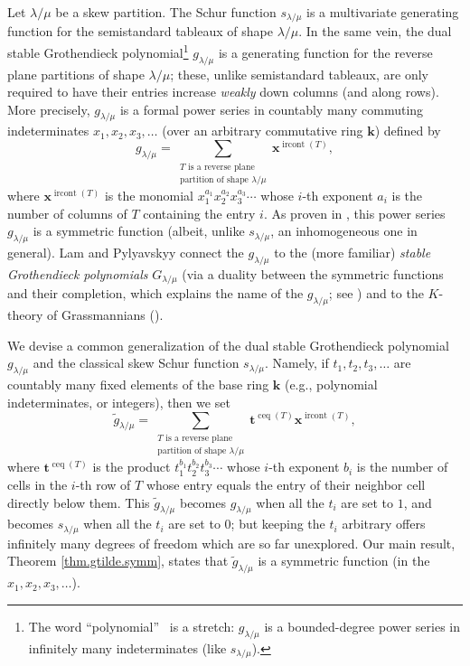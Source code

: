 \documentclass[numbers=enddot,12pt,final,onecolumn,notitlepage]{scrartcl}%
\theoremstyle{definition}
\let\sumnonlimits\sum
\renewcommand{\sum}{\sumnonlimits\limits}
\begin{document}
Let $\lambda/\mu$ be a skew partition. The Schur function $s_{\lambda/\mu}$ is
a multivariate generating function for the semistandard tableaux of shape
$\lambda/\mu$. In the same vein, the dual stable Grothendieck
polynomial\footnote{The word \textquotedblleft polynomial\textquotedblright%
\ is a stretch: $g_{\lambda/\mu}$ is a bounded-degree power series in
infinitely many indeterminates (like $s_{\lambda/\mu}$).} $g_{\lambda/\mu}$ is
a generating function for the reverse plane partitions of shape $\lambda/\mu$;
these, unlike semistandard tableaux, are only required to have their entries
increase \textit{weakly} down columns (and along rows). More precisely,
$g_{\lambda/\mu}$ is a formal power series in countably many commuting
indeterminates $x_{1},x_{2},x_{3},\ldots$ (over an arbitrary commutative ring
$\mathbf{k}$) defined by%
\[
g_{\lambda/\mu}=\sum_{\substack{T\text{ is a reverse plane}\\\text{partition
of shape }\lambda/\mu}}\mathbf{x}^{\operatorname*{ircont}\left(  T\right)  },
\]
where $\mathbf{x}^{\operatorname*{ircont}\left(  T\right)  }$ is the monomial
$x_{1}^{a_{1}}x_{2}^{a_{2}}x_{3}^{a_{3}}\cdots$ whose $i$-th exponent $a_{i}$
is the number of columns of $T$ containing the entry $i$. As proven in
\cite[\S 9.1]{LamPyl}, this power series $g_{\lambda/\mu}$ is a symmetric
function (albeit, unlike $s_{\lambda/\mu}$, an inhomogeneous one in general).
Lam and Pylyavskyy connect the $g_{\lambda/\mu}$ to the (more familiar)
\textit{stable Grothendieck polynomials} $G_{\lambda/\mu}$ (via a duality
between the symmetric functions and their completion, which explains the name
of the $g_{\lambda/\mu}$; see \cite[\S 9.4]{LamPyl}) and to the $K$-theory of
Grassmannians (\cite[\S 9.5]{LamPyl}).

We devise a common generalization of the dual stable Grothendieck polynomial
$g_{\lambda/\mu}$ and the classical skew Schur function $s_{\lambda/\mu}$.
Namely, if $t_{1},t_{2},t_{3},\ldots$ are countably many fixed elements of the
base ring $\mathbf{k}$ (e.g., polynomial indeterminates, or integers), then we
set%
\[
\widetilde{g}_{\lambda/\mu}=\sum_{\substack{T\text{ is a reverse
plane}\\\text{partition of shape }\lambda/\mu}}\mathbf{t}^{\operatorname*{ceq}%
\left(  T\right)  }\mathbf{x}^{\operatorname*{ircont}\left(  T\right)  },
\]
where $\mathbf{t}^{\operatorname*{ceq}\left(  T\right)  }$ is the product
$t_{1}^{b_{1}}t_{2}^{b_{2}}t_{3}^{b_{3}}\cdots$ whose $i$-th exponent $b_{i}$
is the number of cells in the $i$-th row of $T$ whose entry equals the entry
of their neighbor cell directly below them. This $\widetilde{g}_{\lambda/\mu}$
becomes $g_{\lambda/\mu}$ when all the $t_{i}$ are set to $1$, and becomes
$s_{\lambda/\mu}$ when all the $t_{i}$ are set to $0$; but keeping the $t_{i}$
arbitrary offers infinitely many degrees of freedom which are so far
unexplored. Our main result, Theorem \ref{thm.gtilde.symm}, states that
$\widetilde{g}_{\lambda/\mu}$ is a symmetric function (in the $x_{1}%
,x_{2},x_{3},\ldots$).
\end{document}
